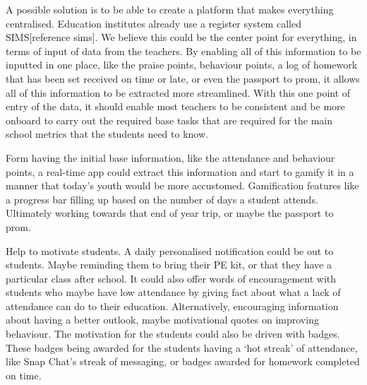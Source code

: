 \documentclass[sigchi]{acmart}
\begin{document}
A possible solution is to be able to create a platform that makes everything centralised. Education institutes already use a register system called SIMS[reference sims]. We believe this could be the center point for everything, in terms of input of data from the teachers. By enabling all of this information to be inputted in one place, like the praise points, behaviour points, a log of homework that has been set received on time or late, or even the passport to prom, it allows all of this information to be extracted more streamlined. With this one point of entry of the data, it should enable most teachers to be consistent and be more onboard to carry out the required base tasks that are required for the main school metrics that the students need to know.

Form having the initial base information, like the attendance and behaviour points, a real-time app could extract this information and start to gamify it in a manner that today’s youth would be more accustomed. Gamification features like a progress bar filling up based on the number of days a student attends. Ultimately working towards that end of year trip, or maybe the passport to prom.

Help to motivate students. A daily personalised notification could be out to students. Maybe reminding them to bring their PE kit, or that they have a particular class after school. It could also offer words of encouragement with students who maybe have low attendance by giving fact about what a lack of attendance can do to their education. Alternatively, encouraging information about having a better outlook, maybe motivational quotes on improving behaviour. The motivation for the students could also be driven with badges. These badges being awarded for the students having a ‘hot streak’ of attendance, like Snap Chat’s streak of messaging, or badges awarded for homework completed on time.
\end{document}
